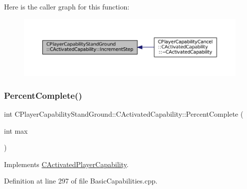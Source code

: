 Here is the caller graph for this function\+:\nopagebreak
\begin{figure}[H]
\begin{center}
\leavevmode
\includegraphics[width=350pt]{classCPlayerCapabilityStandGround_1_1CActivatedCapability_ab4061171835e4c1008176e5765ded595_icgraph}
\end{center}
\end{figure}
\hypertarget{classCPlayerCapabilityStandGround_1_1CActivatedCapability_aa9bf1824e755460b699d81f866f2aadc}{}\label{classCPlayerCapabilityStandGround_1_1CActivatedCapability_aa9bf1824e755460b699d81f866f2aadc} 
\subsubsection{\texorpdfstring{Percent\+Complete()}{PercentComplete()}}
{\footnotesize\ttfamily int C\+Player\+Capability\+Stand\+Ground\+::\+C\+Activated\+Capability\+::\+Percent\+Complete (\begin{DoxyParamCaption}\item[{int}]{max }\end{DoxyParamCaption})\hspace{0.3cm}{\ttfamily [virtual]}}



Implements \hyperlink{classCActivatedPlayerCapability_a405dc6076058006a4f801727de4cfe4d}{C\+Activated\+Player\+Capability}.



Definition at line 297 of file Basic\+Capabilities.\+cpp.


